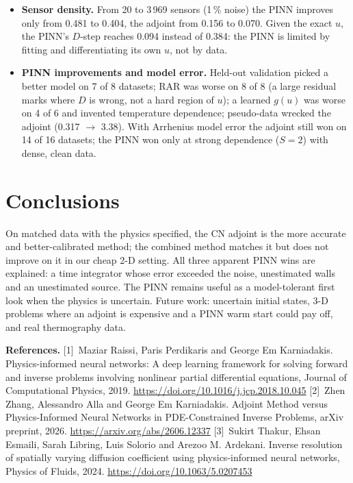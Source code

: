 \documentclass[10pt,a4paper]{article}
\begin{document}
\begin{itemize}
inverts as well as CN (0.093/0.093, 0.053/0.051, 0.047/0.046, 0.060/0.059). The intensive-phase ``PINN wins at high
density'' was this artefact; against CN the PINN reaches 0.384 on the same data (0.132 after 16$\times$ longer training).
\item \textbf{Sensor density.} From 20 to 3\,969 sensors (1\,\% noise) the PINN improves only from 0.481 to 0.404, the
adjoint from 0.156 to 0.070. Given the exact $u$, the PINN's $D$-step reaches 0.094 instead of 0.384: the PINN is limited
by fitting and differentiating its own $\hat u$, not by data.
\item \textbf{PINN improvements and model error.} Held-out validation picked a better model on 7 of 8 datasets; RAR
was worse on 8 of 8 (a large residual marks where $D$ is wrong, not a hard region of $u$); a learned $g(u)$ was worse on
4 of 6 and invented temperature dependence; pseudo-data wrecked the adjoint (0.317 $\to$ 3.38). With Arrhenius model
error the adjoint still won on 14 of 16 datasets; the PINN won only at strong dependence ($S=2$) with dense, clean data.
\end{itemize}

\section{Conclusions}
On matched data with the physics specified, the CN adjoint is the more accurate and better-calibrated method; the
combined method matches it but does not improve on it in our cheap 2-D setting. All three apparent PINN wins are
explained: a time integrator whose error exceeded the noise, unestimated walls and an unestimated source. The PINN
remains useful as a model-tolerant first look when the physics is uncertain. Future work: uncertain initial states,
3-D problems where an adjoint is expensive and a PINN warm start could pay off, and real thermography data.

{\footnotesize
\textbf{References.}
[1]~Maziar Raissi, Paris Perdikaris and George Em Karniadakis. Physics-informed neural networks: A deep learning
framework for solving forward and inverse problems involving nonlinear partial differential equations, Journal of
Computational Physics, 2019. \url{https://doi.org/10.1016/j.jcp.2018.10.045}
[2]~Zhen Zhang, Alessandro Alla and George Em Karniadakis. Adjoint Method versus Physics-Informed Neural Networks in
PDE-Constrained Inverse Problems, arXiv preprint, 2026. \url{https://arxiv.org/abs/2606.12337}
[3]~Sukirt Thakur, Ehsan Esmaili, Sarah Libring, Luis Solorio and Arezoo M. Ardekani. Inverse resolution of spatially
varying diffusion coefficient using physics-informed neural networks, Physics of Fluids, 2024.
\url{https://doi.org/10.1063/5.0207453}
\par}
\end{document}
